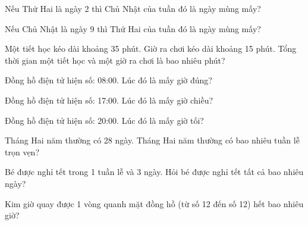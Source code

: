 \begin{ex}
Nếu Thứ Hai là ngày 2 thì Chủ Nhật của tuần đó là ngày mùng mấy?
\end{ex}

\begin{ex}
Nếu Chủ Nhật là ngày 9 thì Thứ Hai của tuần đó là ngày mùng mấy?
\end{ex}

\begin{ex}
Một tiết học kéo dài khoảng 35 phút. Giờ ra chơi kéo dài khoảng 15 phút. Tổng thời gian một tiết học và một giờ ra chơi là bao nhiêu phút?
\end{ex}

\begin{ex}
Đồng hồ điện tử hiện số: 08:00. Lúc đó là mấy giờ đúng?
\end{ex}

\begin{ex}
Đồng hồ điện tử hiện số: 17:00. Lúc đó là mấy giờ chiều?
\end{ex}

\begin{ex}
Đồng hồ điện tử hiện số: 20:00. Lúc đó là mấy giờ tối?
\end{ex}

\begin{ex}
Tháng Hai năm thường có 28 ngày. Tháng Hai năm thường có bao nhiêu tuần lễ trọn vẹn?
\end{ex}

\begin{ex}
Bé được nghỉ tết trong 1 tuần lễ và 3 ngày. Hỏi bé được nghỉ tết tất cả bao nhiêu ngày?
\end{ex}

\begin{ex}
Kim giờ quay được 1 vòng quanh mặt đồng hồ (từ số 12 đến số 12) hết bao nhiêu giờ?
\end{ex}
